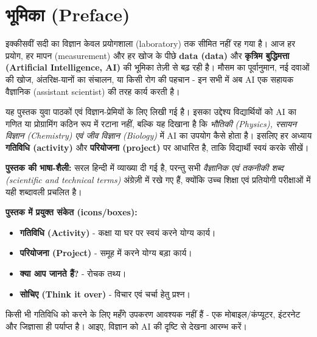 \chapter*{भूमिका (Preface)}

इक्कीसवीं सदी का विज्ञान केवल प्रयोगशाला (laboratory) तक सीमित नहीं रह गया है।
आज हर प्रयोग, हर मापन (measurement) और हर खोज के पीछे \textbf{data (data)} और
\textbf{कृत्रिम बुद्धिमत्ता (Artificial Intelligence, AI)} की भूमिका तेज़ी से बढ़ रही है।
मौसम का पूर्वानुमान, नई दवाओं की खोज, अंतरिक्ष-यानों का संचालन, या किसी रोग की पहचान -
इन सभी में अब AI एक सहायक वैज्ञानिक (assistant scientist) की तरह कार्य करती है।

यह पुस्तक युवा पाठकों एवं विज्ञान-प्रेमियों के लिए लिखी गई है। इसका उद्देश्य
विद्यार्थियों को AI का गणित या प्रोग्रामिंग कठिन रूप में रटाना नहीं, बल्कि यह दिखाना है
कि \emph{भौतिकी (Physics), रसायन विज्ञान (Chemistry) एवं जीव विज्ञान (Biology)} में AI
का उपयोग कैसे होता है। इसलिए हर अध्याय \textbf{गतिविधि (activity)} और
\textbf{परियोजना (project)} पर आधारित है, ताकि विद्यार्थी स्वयं करके सीखें।

\medskip
\noindent\textbf{पुस्तक की भाषा-शैली:} सरल हिन्दी में व्याख्या दी गई है, परन्तु सभी
\emph{वैज्ञानिक एवं तकनीकी शब्द (scientific and technical terms)} अंग्रेज़ी में रखे गए हैं,
क्योंकि उच्च शिक्षा एवं प्रतियोगी परीक्षाओं में यही शब्दावली प्रचलित है।

\medskip
\noindent\textbf{पुस्तक में प्रयुक्त संकेत (icons/boxes):}
\begin{itemize}[leftmargin=1.4em]
  \item \textbf{गतिविधि (Activity)} - कक्षा या घर पर स्वयं करने योग्य कार्य।
  \item \textbf{परियोजना (Project)} - समूह में करने योग्य बड़ा कार्य।
  \item \textbf{क्या आप जानते हैं?} - रोचक तथ्य।
  \item \textbf{सोचिए (Think it over)} - विचार एवं चर्चा हेतु प्रश्न।
\end{itemize}

\medskip
\noindent किसी भी गतिविधि को करने के लिए महँगे उपकरण आवश्यक नहीं हैं - एक मोबाइल/कंप्यूटर,
इंटरनेट और जिज्ञासा ही पर्याप्त है। आइए, विज्ञान को AI की दृष्टि से देखना आरम्भ करें।
